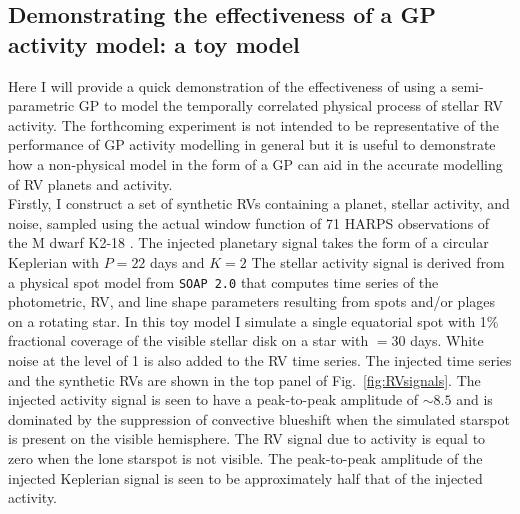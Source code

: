 \subsection{Demonstrating the effectiveness of a GP activity model: a toy model}
Here I will provide a quick demonstration of the effectiveness of using a semi-parametric GP
to model the temporally correlated physical process of stellar RV activity. The forthcoming
experiment is not intended to be representative of the performance of GP activity modelling
in general but it is useful to demonstrate how a non-physical model in the form of a GP can
aid in the accurate modelling of RV planets and activity. \\

Firstly, I construct
a set of synthetic RVs containing a planet, stellar activity, and noise, sampled using the
actual window function of 71 HARPS observations of the M dwarf K2-18 \citep{cloutier17b}.
The injected planetary
signal takes the form of a circular Keplerian with $P=22$ days and $K=2$  The stellar
activity signal is derived from a physical spot model from \texttt{SOAP 2.0} \citep{dumusque14}
that computes time series of the photometric, RV, and line shape parameters resulting from
spots and/or plages on a rotating star. In this toy model I simulate a single equatorial spot
with 1\% fractional coverage of the visible stellar disk on a star with \prot{}$=30$ days.
White noise at the level of 1 \mps{} is also added to the RV time series.
The injected time series and the synthetic RVs are shown in the top panel of
Fig.~\ref{fig:RVsignals}. The injected activity signal is seen to have a peak-to-peak amplitude of
$\sim 8.5$ \mps{} and is dominated by the suppression of convective blueshift when the simulated
starspot is present on the visible hemisphere. The RV signal due to activity is equal to zero when
the lone starspot is not visible. The peak-to-peak amplitude of the injected Keplerian signal is 
seen to be approximately half that of the injected activity. \\


